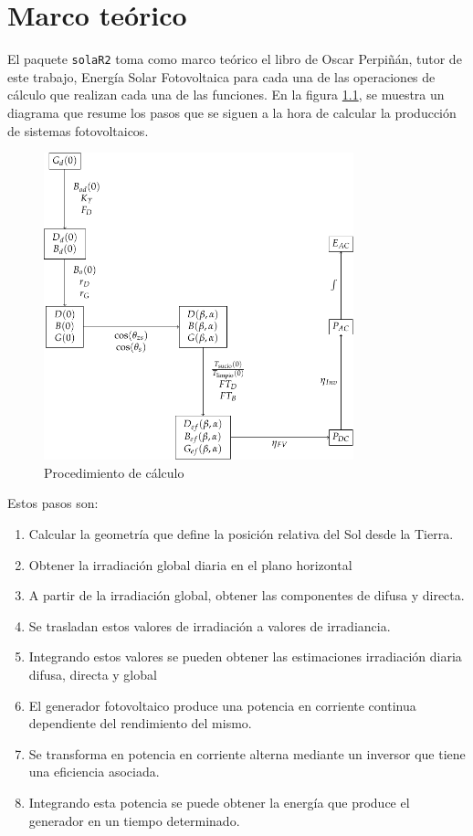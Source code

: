 \chapter{Marco teórico}
\label{chap:marco-teorico}
El paquete \texttt{solaR2} toma como marco teórico el libro de Oscar Perpiñán, tutor de este trabajo, Energía Solar Fotovoltaica \cite{Perpinan2023} para cada una de las operaciones de cálculo que realizan cada una de las funciones.
En la figura \ref{fig:org0f53607}, se muestra un diagrama que resume los pasos que se siguen a la hora de calcular la producción de sistemas fotovoltaicos.
\begin{figure}[htbp]
\centering
\includegraphics[keepaspectratio,width=0.8\textwidth,height=0.5\textheight]{figuras/ProcedimientoCalculoRadiacionInclinada.pdf}
\caption{\label{fig:org0f53607}Procedimiento de cálculo}
\end{figure}
Estos pasos son:
\begin{enumerate}
\item Calcular la geometría que define la posición relativa del Sol desde la Tierra.
\item Obtener la irradiación global diaria en el plano horizontal
\item A partir de la irradiación global, obtener las componentes de difusa y directa.
\item Se trasladan estos valores de irradiación a valores de irradiancia.
\item Integrando estos valores se pueden obtener las estimaciones irradiación diaria difusa, directa y global
\item El generador fotovoltaico produce una potencia en corriente continua dependiente del rendimiento del mismo.
\item Se transforma en potencia en corriente alterna mediante un inversor que tiene una eficiencia asociada.
\item Integrando esta potencia se puede obtener la energía que produce el generador en un tiempo determinado.
\end{enumerate}


